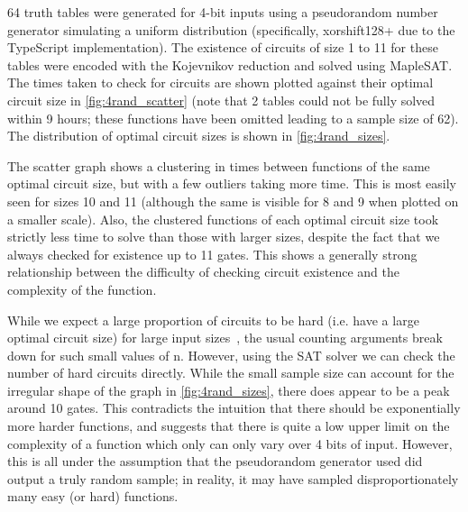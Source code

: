 \documentclass{article}
\begin{document}
64 truth tables were generated for 4-bit inputs using a pseudorandom number generator simulating a uniform distribution (specifically, xorshift128+ due to the TypeScript implementation). The existence of circuits of size 1 to 11 for these tables were encoded with the Kojevnikov reduction and solved using MapleSAT. The times taken to check for circuits are shown plotted against their optimal circuit size in \ref{fig:4rand_scatter} (note that 2 tables could not be fully solved within 9 hours; these functions have been omitted leading to a sample size of 62). The distribution of optimal circuit sizes is shown in \ref{fig:4rand_sizes}.

The scatter graph shows a clustering in times between functions of the same optimal circuit size, but with a few outliers taking more time. This is most easily seen for sizes 10 and 11 (although the same is visible for 8 and 9 when plotted on a smaller scale). Also, the clustered functions of each optimal circuit size took strictly less time to solve than those with larger sizes, despite the fact that we always checked for existence up to 11 gates. This shows a generally strong relationship between the difficulty of checking circuit existence and the complexity of the function.

While we expect a large proportion of circuits to be hard (i.e. have a large optimal circuit size) for large input sizes~\cite{arora}, the usual counting arguments break down for such small values of n. However, using the SAT solver we can check the number of hard circuits directly. While the small sample size can account for the irregular shape of the graph in \ref{fig:4rand_sizes}, there does appear to be a peak around 10 gates. This contradicts the intuition that there should be exponentially more harder functions, and suggests that there is quite a low upper limit on the complexity of a function which only can only vary over 4 bits of input. However, this is all under the assumption that the pseudorandom generator used did output a truly random sample; in reality, it may have sampled disproportionately many easy (or hard) functions.
\end{document}
